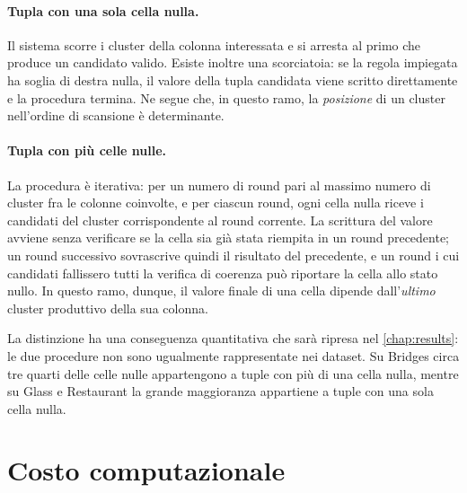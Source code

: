 \paragraph{Tupla con una sola cella nulla.} Il sistema scorre i cluster della colonna interessata
e si arresta al primo che produce un candidato valido. Esiste inoltre una scorciatoia: se la
regola impiegata ha soglia di destra nulla, il valore della tupla candidata viene scritto
direttamente e la procedura termina. Ne segue che, in questo ramo, la \emph{posizione} di un
cluster nell'ordine di scansione è determinante.

\paragraph{Tupla con più celle nulle.} La procedura è iterativa: per un numero di round pari al
massimo numero di cluster fra le colonne coinvolte, e per ciascun round, ogni cella nulla riceve
i candidati del cluster corrispondente al round corrente. La scrittura del valore avviene senza
verificare se la cella sia già stata riempita in un round precedente; un round successivo
sovrascrive quindi il risultato del precedente, e un round i cui candidati fallissero tutti la
verifica di coerenza può riportare la cella allo stato nullo. In questo ramo, dunque, il valore
finale di una cella dipende dall'\emph{ultimo} cluster produttivo della sua colonna.

La distinzione ha una conseguenza quantitativa che sarà ripresa nel \autoref{chap:results}: le
due procedure non sono ugualmente rappresentate nei dataset. Su Bridges circa tre quarti delle
celle nulle appartengono a tuple con più di una cella nulla, mentre su Glass e Restaurant la
grande maggioranza appartiene a tuple con una sola cella nulla.

\section{Costo computazionale}\label{sec:cost}


